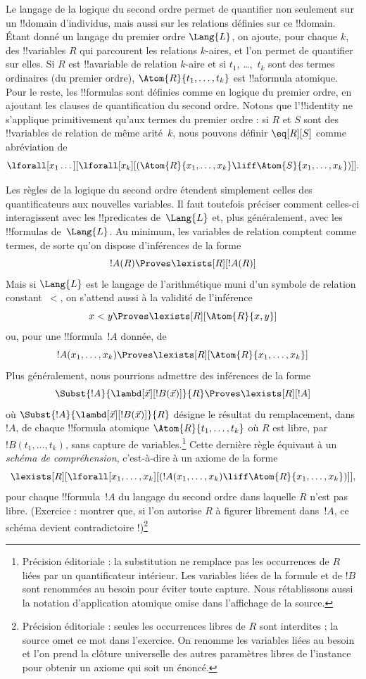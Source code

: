 \documentclass[../../../include/open-logic-section]{subfiles}
\begin{document}


Le langage de la logique du second ordre permet de quantifier non
seulement sur un !!{domain} d'individus, mais aussi sur les relations
définies sur ce !!{domain}. Étant donné un langage du premier ordre
$\Lang{L}$, on ajoute, pour chaque $k$, des !!{variable}s $R$ qui
parcourent les relations $k$-aires, et l'on permet de quantifier sur
elles. Si $R$ est !!a{variable} de relation $k$-aire et si
$t_1$, \dots,~$t_k$ sont des termes ordinaires (du premier ordre),
$\Atom{R}{t_1,\dots,t_k}$ est !!a{formula} atomique. Pour le reste,
les !!{formula}s sont définies comme en logique du premier ordre, en
ajoutant les clauses de quantification du second ordre. Notons que
l'!!{identity} ne s'applique primitivement qu'aux termes du premier
ordre : si $R$ et $S$ sont des !!{variable}s de relation de même
arité~$k$, nous pouvons définir $\eq[R][S]$ comme abréviation de
\[
\lforall[x_1 \dots][\lforall[x_k][(\Atom{R}{x_1, \dots, x_k} \liff
  \Atom{S}{x_1, \dots, x_k})]].
\]

Les règles de la logique du second ordre étendent simplement celles
des quantificateurs aux nouvelles variables. Il faut toutefois
préciser comment celles-ci interagissent avec les !!{predicate}s
de~$\Lang{L}$ et, plus généralement, avec les !!{formula}s
de~$\Lang{L}$. Au
minimum, les variables de relation comptent comme termes, de sorte
qu'on dispose d'inférences de la forme
\[
!A(R) \Proves \lexists[R][!A(R)]
\]
Mais si $\Lang{L}$ est le langage de l'arithmétique muni d'un symbole
de relation constant~$<$, on s'attend aussi à la validité de
l'inférence
\[
x < y \Proves \lexists[R][\Atom{R}{x,y}]
\]
ou, pour une !!{formula}~$!A$ donnée, de
\[
!A(x_1, \dots, x_k) \Proves \lexists[R][\Atom{R}{x_1,\dots,x_k}]
\]
Plus généralement, nous pourrions admettre des inférences de la forme
\[
\Subst{!A}{\lambd[\vec x][!B(\vec x)]}{R} \Proves
\lexists[R][!A]
\]
où $\Subst{!A}{\lambd[\vec x][!B(\vec x)]}{R}$ désigne le résultat du
remplacement, dans~$!A$, de chaque !!{formula} atomique $\Atom{R}{t_1,\dots,t_k}$ où $R$ est libre,
par $!B(t_1, \dots, t_k)$, sans capture de variables.\footnote{Précision éditoriale : la substitution ne remplace pas les occurrences de $R$ liées par un quantificateur intérieur. Les variables liées de la formule et de $!B$ sont renommées au besoin pour éviter toute capture. Nous rétablissons aussi la notation d'application atomique omise dans l'affichage de la source.} Cette dernière
règle équivaut à un {\em schéma de compréhension}, c'est-à-dire à un
axiome de la forme
\[
\lexists[R][\lforall[x_1, \dots, x_k][(!A(x_1, \dots, x_k) \liff
\Atom{R}{x_1, \dots, x_k})]],
\]
pour chaque !!{formula}~$!A$ du langage du second ordre dans laquelle
$R$ n'est pas libre. (Exercice : montrer que, si l'on autorise $R$ à
figurer librement dans~$!A$, ce schéma devient contradictoire !)\footnote{Précision éditoriale : seules les occurrences libres de $R$ sont interdites ; la source omet ce mot dans l'exercice. On renomme les variables liées au besoin et l'on prend la clôture universelle des autres paramètres libres de l'instance pour obtenir un axiome qui soit un énoncé.}
\end{document}
